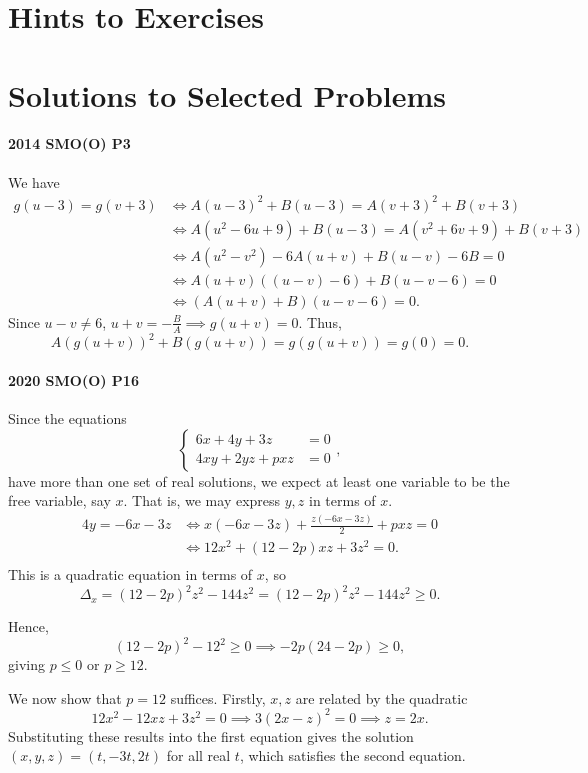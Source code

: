 \documentclass[../jarvis.tex]{subfiles}
\begin{document}
\section{Hints to Exercises}
\printhint
\section{Solutions to Selected Problems}
\paragraph{2014 SMO(O) P3}
We have
\begin{align*}
    g(u-3)=g(v+3) &\iff A(u-3)^2+B(u-3)=A(v+3)^2+B(v+3) \\
    &\iff A(u^2-6u+9)+B(u-3)=A(v^2+6v+9)+B(v+3)\\
    &\iff A(u^2-v^2)-6A(u+v)+B(u-v)-6B=0 \\
    &\iff A(u+v)((u-v)-6)+B(u-v-6)=0 \\
    &\iff (A(u+v)+B)(u-v-6)=0.
\end{align*}
Since $u-v\neq 6$, $u+v=-\frac{B}{A} \implies g(u+v)=0$. Thus,
$$A(g(u+v))^2+B(g(u+v))=g(g(u+v))=g(0)=\boxed{0}.$$
\paragraph{2020 SMO(O) P16}Since the equations
$$\begin{cases}
    6x+4y+3z&=0 \\
    4xy+2yz+pxz&=0
\end{cases},$$
have more than one set of real solutions, we expect at least one variable to be the free variable, say $x$. That is, we may express $y,z$ in terms of $x$.
\begin{align*}
    4y=-6x-3z &\iff x(-6x-3z)+\frac{z(-6x-3z)}{2}+pxz=0 \\ &\iff 12x^2+(12-2p)xz+3z^2=0. \\
\end{align*}
This is a quadratic equation in terms of $x$, so
$$\Delta_{x}=(12-2p)^2z^2-144z^2=(12-2p)^2z^2-144z^2\geq 0.$$

Hence, 
$$(12-2p)^2-12^2\geq 0 \implies -2p(24-2p)\geq 0,$$
giving $p\leq 0$ or $p\geq 12$.

We now show that $p=12$ suffices. Firstly, $x,z$ are related by the quadratic $$12x^2-12xz+3z^2=0 \implies 3(2x-z)^2=0 \implies z=2x.$$
Substituting these results into the first equation gives the solution $(x,y,z)=(t,-3t,2t)$ for all real $t$, which satisfies the second equation.
\end{document}
